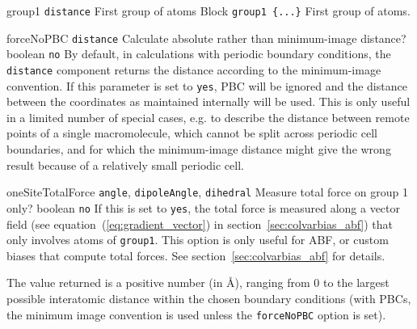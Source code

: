 \begin{cvcoptions}
\item %
  \key
    {group1}{%
    \texttt{distance}}{%
    First group of atoms}{%
    Block \texttt{group1 \{...\}}}{%
    First group of atoms.}

\item %

\item %
  \keydef
    {forceNoPBC}{%
    \texttt{distance}}{%
    Calculate absolute rather than minimum-image distance?}{%
    boolean}{%
    \texttt{no}}{%
    By default, in calculations with periodic boundary conditions, the
    \texttt{distance} component returns the distance according to the
    minimum-image convention. If this parameter is set to \texttt{yes},
    PBC will be ignored and the distance between the coordinates as maintained
    internally will be used. This is only useful in a limited number of
    special cases, e.g. to describe the distance between remote points
    of a single macromolecule, which cannot be split across periodic cell
    boundaries, and for which the minimum-image distance might give the
    wrong result because of a relatively small periodic cell.}

\item %
  \keydef
    {oneSiteTotalForce}{%
    \texttt{angle}, \texttt{dipoleAngle}, \texttt{dihedral}}{%
    Measure total force on group 1 only?}{%
    boolean}{%
    \texttt{no}}{%
    If this is set to \texttt{yes}, the total force is measured along
    a vector field (see equation~(\ref{eq:gradient_vector}) in
    section~\ref{sec:colvarbias_abf}) that only involves atoms of
    \texttt{group1}.  This option is only useful for ABF, or custom
    biases that compute total forces.  See
    section~\ref{sec:colvarbias_abf} for details.}

\end{cvcoptions}

The value returned is a positive number (in \AA), ranging from $0$
to the largest possible interatomic distance within the chosen
boundary conditions (with PBCs, the minimum image convention is used
unless the \texttt{forceNoPBC} option is set).



